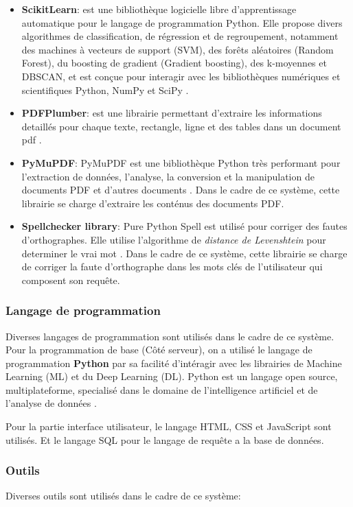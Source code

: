\begin{itemize}
    \item \textbf{ScikitLearn}: est une bibliothèque logicielle libre d'apprentissage automatique pour le langage de programmation Python. Elle propose divers algorithmes de classification, de régression et de regroupement, notamment des machines à vecteurs de support (SVM), des forêts aléatoires (Random Forest), du boosting de gradient (Gradient boosting), des k-moyennes et DBSCAN, et est conçue pour interagir avec les bibliothèques numériques et scientifiques Python, NumPy et SciPy \citep*{scikit-learn}.
    \item \textbf{PDFPlumber}: est une librairie permettant d'extraire les informations detaillés pour chaque texte, rectangle, ligne et des tables dans un document pdf \citep*{pdfplumber}.
    \item \textbf{PyMuPDF}: PyMuPDF est une bibliothèque Python très performant pour l'extraction de données, l'analyse, la conversion et la manipulation de documents PDF et d'autres documents \citep*{fitz}. Dans le cadre de ce système, cette librairie se charge d'extraire les conténus des documents PDF\@.
    \item \textbf{Spellchecker library}: Pure Python Spell est utilisé pour corriger des fautes d'orthographes. Elle utilise l'algorithme de \emph{distance de Levenshtein} pour determiner le vrai mot \citep*{spellchecker}. Dans le cadre de ce système, cette librairie se charge de corriger la faute d'orthographe dans les mots clés de l'utilisateur qui composent son requête.
\end{itemize}

\subsubsection{Langage de programmation}
Diverses langages de programmation sont utilisés dans le cadre de ce système. Pour la programmation de base (Côté serveur), on a utilisé le langage de programmation \textbf{Python} par sa facilité d'intéragir avec les librairies de Machine Learning (ML) et du Deep Learning (DL). Python est un langage open source, multiplateforme, specialisé dans le domaine de l'intelligence artificiel et de l'analyse de données \citep{python}.

Pour la partie interface utilisateur, le langage HTML, CSS et JavaScript sont utilisés. Et le langage SQL pour le langage de requête a la base de données.

\subsubsection{Outils}
Diverses outils sont utilisés dans le cadre de ce système:

